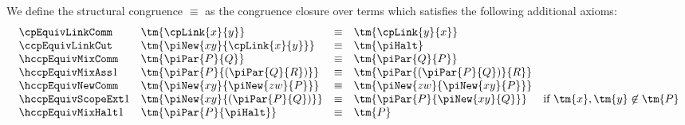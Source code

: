 \begin{definition}\label{def:ccp-equiv}
  We define the structural congruence $\equiv$ as the congruence closure over
  terms which satisfies the following additional axioms:
  \begin{gather*}
    \begin{array}{llcll}
      \cpEquivLinkComm
      & \tm{\cpLink{x}{y}}
      & \equiv
      & \tm{\cpLink{y}{x}}
      \\
      \ccpEquivLinkCut
      & \tm{\piNew{xy}{\cpLink{x}{y}}}
      & \equiv
      & \tm{\piHalt}
      \\
      \hccpEquivMixComm
      & \tm{\piPar{P}{Q}}
      & \equiv
      & \tm{\piPar{Q}{P}}
      \\
      \hccpEquivMixAss1
      & \tm{\piPar{P}{( \piPar{Q}{R} )}}
      & \equiv
      & \tm{\piPar{( \piPar{P}{Q} )}{R}}
      \\
      \hccpEquivNewComm
      & \tm{\piNew{xy}{\piNew{zw}{P}}}
      & \equiv
      & \tm{\piNew{zw}{\piNew{xy}{P}}}
      \\
      \hccpEquivScopeExt1
      & \tm{\piNew{xy}{( \piPar{P}{Q} )}}
      & \equiv
      & \tm{\piPar{P}{\piNew{xy}{Q}}}
      & \text{if }\tm{x},\tm{y}\not\in\tm{P}
      \\
      \hccpEquivMixHalt1
      & \tm{\piPar{P}{\piHalt}}
      & \equiv
      & \tm{P}
    \end{array}
  \end{gather*}
\end{definition}
